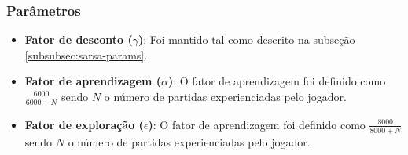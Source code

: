 \subsubsection{Parâmetros}
\label{subsubsec:tabular-params}

\begin{itemize}
	\item \textbf{Fator de desconto ($\gamma$)}: Foi mantido tal como descrito na subseção \ref{subsubsec:sarsa-params}.
	
	\item \textbf{Fator de aprendizagem ($\alpha$)}: O fator de aprendizagem foi definido como $\frac{6000}{6000+N}$ sendo $N$ o número de partidas experienciadas pelo jogador. 
	
	\item \textbf{Fator de exploração ($\epsilon$)}: O fator de aprendizagem foi definido como $\frac{8000}{8000+N}$ sendo $N$ o número de partidas experienciadas pelo jogador. 
\end{itemize}